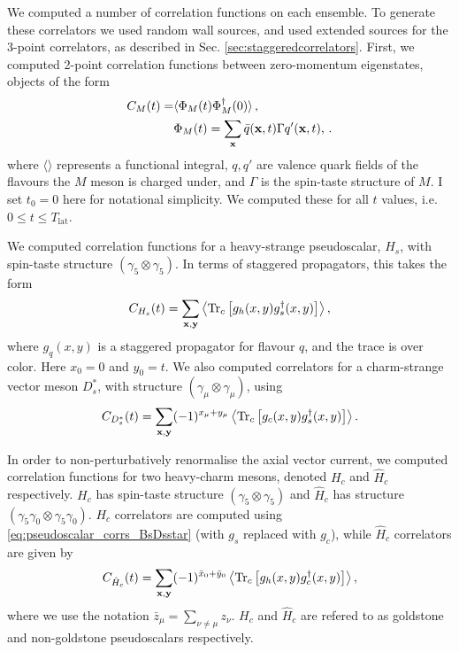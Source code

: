 We computed a number of correlation functions on each ensemble. To generate these correlators we used random wall sources, and used extended sources for the 3-point correlators, as described in Sec. \ref{sec:staggeredcorrelators}. First, we computed 2-point correlation functions between zero-momentum eigenstates, objects of the form
\begin{align}
  C_{M}(t) =& \langle \Phi_M (t) \Phi_M^{\dagger}(0) \rangle\,, \\ 
  &\Phi_M(t) = \sum_{{\bf{x}}} \bar{q}({\bf{x}},t) \Gamma q'({\bf{x}},t), \nonumber\,.
\end{align}
where $\langle \rangle$ represents a functional integral, $q,q'$ are valence quark fields of the flavours the $M$ meson is charged under, and $\Gamma$ is the spin-taste structure of $M$. I set $t_0=0$ here for notational simplicity. We computed these for all $t$ values, i.e. $0\leq t \leq T_{\text{lat}}$. 

We computed correlation functions for a heavy-strange pseudoscalar, $H_s$, with spin-taste structure $(\gamma_5\otimes \gamma_5)$. In terms of staggered propagators, this takes the form
\begin{align}
  C_{H_s}(t) = \sum_{\bf{x},\bf{y}} \left\langle \text{Tr}_c\left[ g_h(x,y) g_s^{\dagger}(x,y) \right] \right\rangle,
  \label{eq:pseudoscalar_corrs_BsDsstar}
\end{align}
where $g_q(x,y)$ is a staggered propagator for flavour $q$, and the trace is over color. Here $x_0=0$ and $y_0=t$. We also computed correlators for a charm-strange vector meson $D_s^*$, with structure $(\gamma_{\mu}\otimes \gamma_{\mu})$, using
\begin{align}
  C_{D_s^*}(t) = \sum_{\bf{x},\bf{y}} (-1)^{x_{\mu}+y_{\mu}} \left\langle \text{Tr}_c\left[ g_c(x,y) g_s^{\dagger}(x,y) \right] \right\rangle.
\end{align}

In order to non-perturbatively renormalise the axial vector current, we computed correlation functions for two heavy-charm mesons, denoted $H_c$ and $\hat{H}_c$ respectively. $H_c$ has spin-taste structure $(\gamma_5\otimes \gamma_5)$ and $\hat{H}_c$ has structure $(\gamma_5\gamma_0\otimes \gamma_5\gamma_0)$. $H_c$ correlators are computed using \eqref{eq:pseudoscalar_corrs_BsDsstar} (with $g_s$ replaced with $g_c$), while $\hat{H}_c$ correlators are given by
\begin{align}
  C_{\hat{H}_c}(t) = \sum_{\bf{x},\bf{y}}(-1)^{\bar{x}_0+\bar{y}_0} \left\langle \text{Tr}_c\left[ g_h(x,y) g^{\dagger}_c(x,y) \right] \right\rangle,
\end{align}
where we use the notation $\bar{z}_{\mu} = \sum_{\nu\neq\mu} z_{\nu}$. $H_c$ and $\hat{H}_c$ are refered to as goldstone and non-goldstone pseudoscalars respectively.

